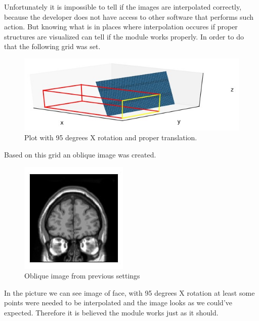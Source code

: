 \indent Unfortunately it is impossible to tell if the images are interpolated correctly, because the developer does not have access to other software that performs such action. But knowing what is in places where interpolation occures if proper structures are visualized can tell if the module works properly.
\indent In order to do that the following grid was set.

\begin{figure}[H]
\centering{}\includegraphics[scale=0.7]{figures/module_12/mod12eyes}\caption{Plot with 95 degrees X rotation and proper translation. \label{fig:figures/module_12/Preprocessing}}
\end{figure}
\indent Based on this grid an oblique image was created.
\begin{figure}[H]
\centering{}\includegraphics[scale=0.7]{figures/module_12/mod12eyesobl}\caption{Oblique image from previous settings \label{fig:figures/module_12/Preprocessing}}
\end{figure}
\indent In the picture we can see image of face, with 95 degrees X rotation at least some points were needed to be interpolated and the image looks as we could've expected. Therefore it is believed the module works just as it should.